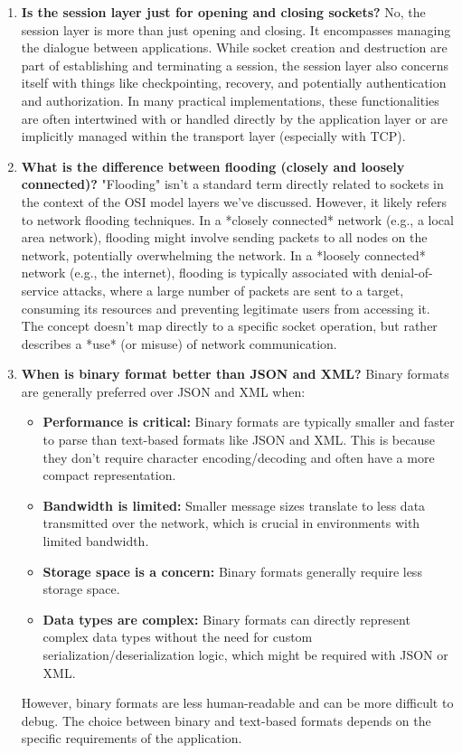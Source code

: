\begin{enumerate}[noitemsep]
    \item \textbf{Is the session layer just for opening and closing sockets?}  No, the session layer is more than just opening and closing. It encompasses managing the dialogue between applications. While socket creation and destruction are part of establishing and terminating a session, the session layer also concerns itself with things like checkpointing, recovery, and potentially authentication and authorization. In many practical implementations, these functionalities are often intertwined with or handled directly by the application layer or are implicitly managed within the transport layer (especially with TCP).

    \item \textbf{What is the difference between flooding (closely and loosely connected)?}  "Flooding" isn't a standard term directly related to sockets in the context of the OSI model layers we've discussed. However, it likely refers to network flooding techniques.  In a *closely connected* network (e.g., a local area network), flooding might involve sending packets to all nodes on the network, potentially overwhelming the network.  In a *loosely connected* network (e.g., the internet), flooding is typically associated with denial-of-service attacks, where a large number of packets are sent to a target, consuming its resources and preventing legitimate users from accessing it. The concept doesn't map directly to a specific socket operation, but rather describes a *use* (or misuse) of network communication.

    \item \textbf{When is binary format better than JSON and XML?} Binary formats are generally preferred over JSON and XML when:
        \begin{itemize}
            \item \textbf{Performance is critical:} Binary formats are typically smaller and faster to parse than text-based formats like JSON and XML. This is because they don't require character encoding/decoding and often have a more compact representation.
            \item \textbf{Bandwidth is limited:} Smaller message sizes translate to less data transmitted over the network, which is crucial in environments with limited bandwidth.
            \item \textbf{Storage space is a concern:} Binary formats generally require less storage space.
            \item \textbf{Data types are complex:} Binary formats can directly represent complex data types without the need for custom serialization/deserialization logic, which might be required with JSON or XML.
        \end{itemize}
        However, binary formats are less human-readable and can be more difficult to debug.  The choice between binary and text-based formats depends on the specific requirements of the application.
\end{enumerate}

